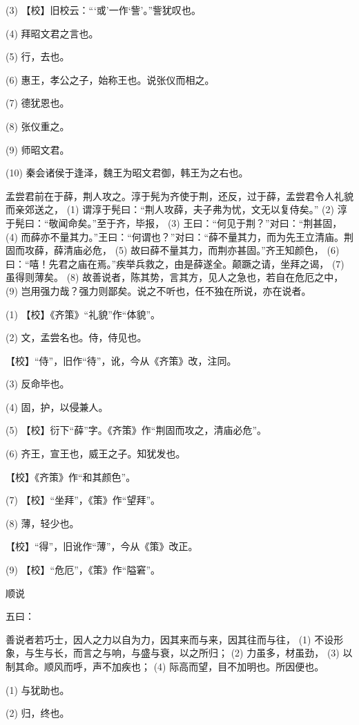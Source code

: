 \documentclass[12pt,UTF8]{ctexbook}
\begin{document}
(3) 【校】旧校云：“‘或’一作‘訾’。”訾犹叹也。

(4) 拜昭文君之言也。

(5) 行，去也。

(6) 惠王，孝公之子，始称王也。说张仪而相之。

(7) 德犹恩也。

(8) 张仪重之。

(9) 师昭文君。

(10) 秦会诸侯于逢泽，魏王为昭文君御，韩王为之右也。

孟尝君前在于薛，荆人攻之。淳于髡为齐使于荆，还反，过于薛，孟尝君令人礼貌而亲郊送之， (1) 谓淳于髡曰：“荆人攻薛，夫子弗为忧，文无以复侍矣。” (2) 淳于髡曰：“敬闻命矣。”至于齐，毕报， (3) 王曰：“何见于荆？”对曰：“荆甚固， (4) 而薛亦不量其力。”王曰：“何谓也？”对曰：“薛不量其力，而为先王立清庙。荆固而攻薛，薛清庙必危， (5) 故曰薛不量其力，而荆亦甚固。”齐王知颜色， (6) 曰：“嘻！先君之庙在焉。”疾举兵救之，由是薛遂全。颠蹶之请，坐拜之谒， (7) 虽得则薄矣。 (8) 故善说者，陈其势，言其方，见人之急也，若自在危厄之中， (9) 岂用强力哉？强力则鄙矣。说之不听也，任不独在所说，亦在说者。

(1) 【校】《齐策》“礼貌”作“体貌”。

(2) 文，孟尝名也。侍，侍见也。

【校】“侍”，旧作“待”，讹，今从《齐策》改，注同。

(3) 反命毕也。

(4) 固，护，以侵兼人。

(5) 【校】衍下“薛”字。《齐策》作“荆固而攻之，清庙必危”。

(6) 齐王，宣王也，威王之子。知犹发也。

【校】《齐策》作“和其颜色”。

(7) 【校】“坐拜”，《策》作“望拜”。

(8) 薄，轻少也。

【校】“得”，旧讹作“薄”，今从《策》改正。

(9) 【校】“危厄”，《策》作“隘窘”。





顺说


五曰：

善说者若巧士，因人之力以自为力，因其来而与来，因其往而与往， (1) 不设形象，与生与长，而言之与响，与盛与衰，以之所归； (2) 力虽多，材虽劲， (3) 以制其命。顺风而呼，声不加疾也； (4) 际高而望，目不加明也。所因便也。

(1) 与犹助也。

(2) 归，终也。
\end{document}
